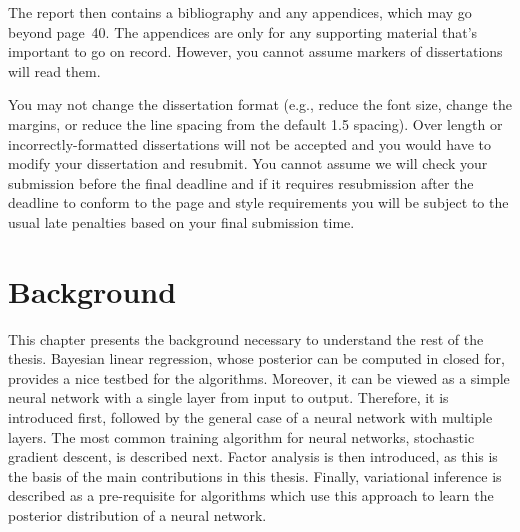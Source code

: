 \documentclass[msc,deptreport.inf]{infthesis} %
\begin{document}
The report then contains a bibliography and any appendices, which may go beyond
page~40. The appendices are only for any supporting material that's important to
go on record. However, you cannot assume markers of dissertations will read them.

You may not change the dissertation format (e.g., reduce the font
size, change the margins, or reduce the line spacing from the default
1.5 spacing). Over length or incorrectly-formatted dissertations will
not be accepted and you would have to modify your dissertation and
resubmit.  You cannot assume we will check your submission before the
final deadline and if it requires resubmission after the deadline to
conform to the page and style requirements you will be subject to the
usual late penalties based on your final submission time.

%
%
%
%
%
%


\chapter{Background}\label{ch:background}

This chapter presents the background necessary to understand the rest of the thesis. Bayesian linear regression, whose posterior can be computed in closed for, provides a nice testbed for the algorithms. Moreover, it can be viewed as a simple neural network with a single layer from input to output. Therefore, it is introduced first, followed by the general case of a neural network with multiple layers. The most common training algorithm for neural networks, stochastic gradient descent, is described next. Factor analysis is then introduced, as this is the basis of the main contributions in this thesis. Finally, variational inference is described as a pre-requisite for algorithms which use this approach to learn the posterior distribution of a neural network. 
\end{document}
